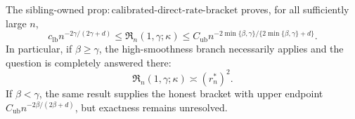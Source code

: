 The sibling-owned \(\mathrm{prop:calibrated\text{-}direct\text{-}rate\text{-}bracket}\) proves, for all sufficiently large \(n\),
\[
c_{\mathrm{lb}}n^{-2\gamma/(2\gamma+d)}
\le\mathfrak R_n(1,\gamma;\kappa)
\le C_{\mathrm{ub}}n^{-2\min\{\beta,\gamma\}/\{2\min\{\beta,\gamma\}+d\}}.
\]
In particular, if \(\beta\ge\gamma\), the high-smoothness branch necessarily applies and the question is completely answered there:
\[
\mathfrak R_n(1,\gamma;\kappa)\asymp(r_n^*)^2.
\]
If \(\beta<\gamma\), the same result supplies the honest bracket with upper endpoint \(C_{\mathrm{ub}}n^{-2\beta/(2\beta+d)}\), but exactness remains unresolved.